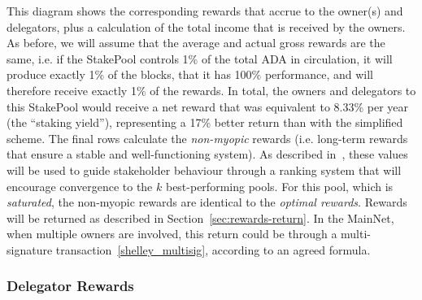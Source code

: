 \documentclass[11pt,a4paper,dvipsnames,twosided,final]{article}
\newcommand{\khcomment}[1]{\todo[color=blue!20]{KH: #1}}
\newcommand{\ada}{ADA{}}
\begin{document}
\noindent
This diagram shows the corresponding rewards that accrue to the owner(s) and delegators,
plus a calculation of the total income that is received by the owners.  As before, we will assume that the average
and actual gross rewards are the same, i.e. if the StakePool controls 1\% of the total \ada{} in
circulation, it will produce exactly 1\% of the blocks, that it has 100\% performance, and will therefore receive exactly 1\% of the rewards.
In total, the
owners and delegators to this StakePool would receive a net reward that was equivalent to 8.33\% per year
(the ``staking yield''), representing a 17\% better return than with the simplified scheme.
The final rows calculate the \emph{non-myopic} rewards (i.e. long-term rewards that ensure
a stable and well-functioning system).  As described in~\cite{delegation_design}, these values will be used to guide stakeholder behaviour
through a ranking system that will encourage convergence to the $k$ best-performing pools.
For this pool, which is \emph{saturated}, the non-myopic rewards are identical to the \emph{optimal rewards}.
\khcomment{Is this always the case?}
Rewards will be returned as described in Section~\ref{sec:rewards-return}.  In the MainNet, when multiple
owners are involved, this return could be through a multi-signature transaction~\ref{shelley_multisig}, according to an agreed
formula.

\subsubsection*{Delegator Rewards}
\end{document}
